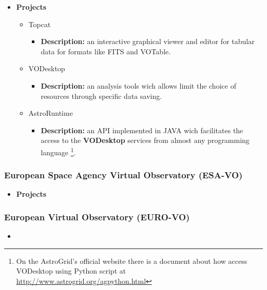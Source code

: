 \documentclass[11pt]{article}
\begin{document}
                \begin{itemize}
                    \item \textbf{Projects}
                        \begin{itemize}
                            \item Topcat
                                \begin{itemize}
                                    \item \textbf{Description:} an interactive
graphical viewer and editor for tabular data for formats like FITS and VOTable.
                                \end{itemize}
                            \item VODesktop
                                \begin{itemize}
                                    \item \textbf{Description:} an analysis
tools wich allows limit the choice of resources through specific data saving.
                                \end{itemize}
                            \item AstroRuntime
                                \begin{itemize}
                                    \item \textbf{Description:} an API
implemented in JAVA wich facilitates the access to the \textbf{VODesktop}
services from almost any programming language \footnote{On the AstroGrid's
official website there is a document about how access VODesktop using Python
script at \url{http://www.astrogrid.org/agpython.html}}. 
                                \end{itemize}
                        \end{itemize}
                \end{itemize}

            \subsubsection{European Space Agency Virtual Observatory (ESA-VO)}
                \begin{itemize}
                    \item \textbf{Projects}
                \end{itemize}

            \subsubsection{European Virtual Observatory (EURO-VO)}
                \begin{itemize}
                    \item
                \end{itemize}
\end{document}
